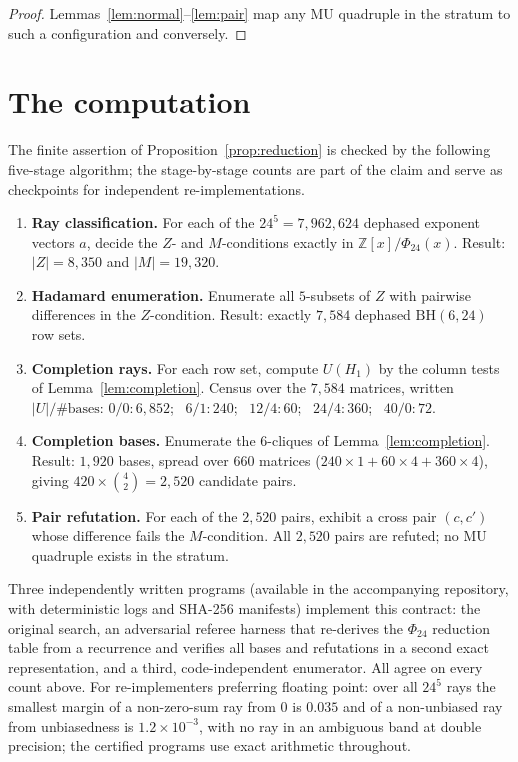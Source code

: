 \documentclass[11pt]{article}
\theoremstyle{remark}
\newcommand{\ZZ}{\mathbb{Z}}
\begin{document}
\begin{proof}
Lemmas~\ref{lem:normal}--\ref{lem:pair} map any MU quadruple in the
stratum to such a configuration and conversely.
\end{proof}

\section{The computation}\label{sec:computation}

The finite assertion of Proposition~\ref{prop:reduction} is checked by
the following five-stage algorithm; the stage-by-stage counts are part
of the claim and serve as checkpoints for independent
re-implementations.

\begin{enumerate}
\item \textbf{Ray classification.} For each of the $24^5 = 7{,}962{,}624$
  dephased exponent vectors $a$, decide the $Z$- and $M$-conditions
  exactly in $\ZZ[x]/\Phi_{24}(x)$. Result: $|Z| = 8{,}350$ and $|M| =
  19{,}320$.
\item \textbf{Hadamard enumeration.} Enumerate all $5$-subsets of $Z$
  with pairwise differences in the $Z$-condition. Result: exactly
  $7{,}584$ dephased $\mathrm{BH}(6,24)$ row sets.
\item \textbf{Completion rays.} For each row set, compute $U(H_1)$ by
  the column tests of Lemma~\ref{lem:completion}. Census over the
  $7{,}584$ matrices, written $|U|/\#\text{bases}$:
  $0/0: 6{,}852$; \ $6/1: 240$; \ $12/4: 60$; \ $24/4: 360$; \
  $40/0: 72$.
\item \textbf{Completion bases.} Enumerate the $6$-cliques of
  Lemma~\ref{lem:completion}. Result: $1{,}920$ bases, spread over
  $660$ matrices ($240 \times 1 + 60 \times 4 + 360 \times 4$),
  giving $420 \times \binom{4}{2} = 2{,}520$ candidate pairs.
\item \textbf{Pair refutation.} For each of the $2{,}520$ pairs,
  exhibit a cross pair $(c, c')$ whose difference fails the
  $M$-condition. All $2{,}520$ pairs are refuted; no MU quadruple
  exists in the stratum.
\end{enumerate}

Three independently written programs (available in the accompanying
repository, with deterministic logs and SHA-256 manifests) implement
this contract: the original search, an adversarial referee harness that
re-derives the $\Phi_{24}$ reduction table from a recurrence and
verifies all bases and refutations in a second exact representation,
and a third, code-independent enumerator. All agree on every count
above. For re-implementers preferring floating point: over all $24^5$
rays the smallest margin of a non-zero-sum ray from $0$ is $0.035$ and
of a non-unbiased ray from unbiasedness is $1.2 \times 10^{-3}$, with
no ray in an ambiguous band at double precision; the certified programs
use exact arithmetic throughout.
\end{document}
